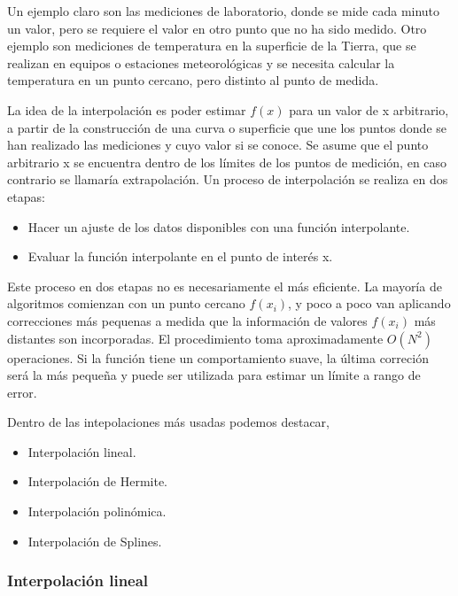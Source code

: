 \documentclass[
  12pt,
]{krantz}
\providecommand{\tightlist}{%
  \setlength{\itemsep}{0pt}\setlength{\parskip}{0pt}}
\begin{document}
Un ejemplo claro son las mediciones de laboratorio, donde se mide cada minuto un valor, pero se requiere el valor en otro punto que no ha sido medido. Otro ejemplo son mediciones de temperatura en la superficie
de la Tierra, que se realizan en equipos o estaciones meteorológicas y se necesita calcular la temperatura en un punto cercano, pero distinto al punto de medida.

La idea de la interpolación es poder estimar \(f(x)\) para un valor de x arbitrario, a partir de la construcción de una curva o superficie que une los puntos donde se han realizado las mediciones y cuyo valor si se conoce. Se asume que el punto arbitrario x se encuentra dentro de los límites de los puntos de medición, en caso contrario se llamaría extrapolación. Un proceso de interpolación se realiza en dos etapas:

\begin{itemize}
\tightlist
\item
  Hacer un ajuste de los datos disponibles con una función interpolante.
\item
  Evaluar la función interpolante en el punto de interés x.
\end{itemize}

Este proceso en dos etapas no es necesariamente el más
eficiente. La mayoría de algoritmos comienzan con un punto cercano \(f(x_{i})\), y poco a poco van aplicando correcciones más pequenas a medida que la información de valores \(f(x_{i})\) más distantes son incorporadas. El procedimiento toma aproximadamente \(O(N^{2})\) operaciones. Si la función tiene un comportamiento suave, la última correción será la más pequeña y puede ser utilizada para estimar un límite a rango de error.

Dentro de las intepolaciones más usadas podemos destacar,

\begin{itemize}
\tightlist
\item
  Interpolación lineal.
\item
  Interpolación de Hermite.
\item
  Interpolación polinómica.
\item
  Interpolación de Splines.
\end{itemize}

\hypertarget{interpolacion-lineal}{%
\subsubsection{Interpolación lineal}\label{interpolacion-lineal}}
\end{document}
